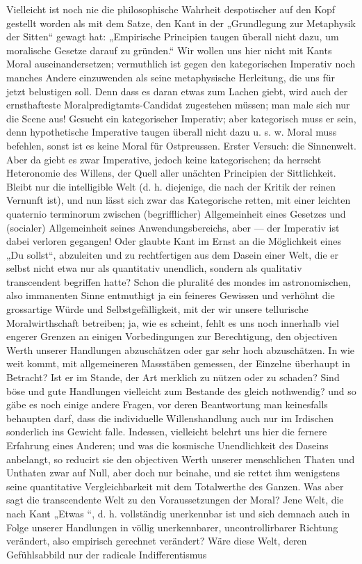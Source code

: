 Vielleicht ist noch nie die philosophische Wahrheit despotischer auf den Kopf gestellt worden als mit dem Satze, den Kant in der „Grundlegung zur Metaphysik der Sitten“ gewagt hat: „Empirische Principien taugen überall nicht dazu, um moralische Gesetze darauf zu gründen.“ Wir wollen uns hier nicht mit Kants Moral auseinandersetzen; vermuthlich ist gegen den kategorischen Imperativ noch manches Andere einzuwenden als seine metaphysische Herleitung, die uns für jetzt belustigen soll. Denn dass es daran etwas zum Lachen giebt, wird auch der ernsthafteste Moralpredigtamts-Candidat zugestehen müssen; man male sich nur die Scene aus! Gesucht ein kategorischer Imperativ; aber kategorisch muss er sein, denn hypothetische Imperative taugen überall nicht dazu u. s. w. Moral muss  befehlen, sonst ist es keine Moral für Ostpreussen. Erster Versuch: die Sinnenwelt. Aber da giebt es zwar Imperative, jedoch keine kategorischen; da herrscht Heteronomie des Willens, der Quell aller unächten Principien der Sittlichkeit. Bleibt nur die intelligible Welt (d. h. diejenige, die nach der Kritik der reinen Vernunft  ist), und nun lässt sich zwar das Kategorische retten, mit einer leichten quaternio terminorum zwischen (begrifflicher) Allgemeinheit eines Gesetzes und (socialer) Allgemeinheit seines Anwendungsbereichs, aber — der Imperativ ist dabei verloren gegangen! Oder glaubte Kant im Ernst an die Möglichkeit eines „Du sollst“, abzuleiten und zu rechtfertigen aus dem Dasein einer Welt, die er selbst nicht etwa nur als quantitativ unendlich, sondern als qualitativ transcendent begriffen hatte? Schon die pluralité des mondes im astronomischen, also immanenten Sinne entmuthigt ja ein feineres Gewissen und verhöhnt die grossartige Würde und Selbstgefälligkeit, mit der wir unsere tellurische Moralwirthschaft betreiben; ja, wie es scheint, fehlt es uns noch innerhalb viel engerer Grenzen an einigen Vorbedingungen zur Berechtigung, den objectiven Werth unserer Handlungen abzuschätzen oder gar sehr hoch abzuschätzen. In wie weit kommt, mit allgemeineren Massstäben gemessen, der Einzelne überhaupt in Betracht? Ist er im Stande, der Art merklich zu nützen oder zu schaden? Sind böse und gute Handlungen vielleicht zum Bestande des  gleich nothwendig? und so gäbe es noch einige andere Fragen, vor deren Beantwortung man keinesfalls behaupten darf, dass die individuelle Willenshandlung auch nur im Irdischen sonderlich ins Gewicht falle. Indessen, vielleicht belehrt uns hier die fernere Erfahrung eines Anderen; und was die kosmische Unendlichkeit des Daseins anbelangt, so reducirt sie den objectiven Werth unserer menschlichen Thaten und Unthaten zwar  auf Null, aber doch nur beinahe, und sie rettet ihm wenigstens seine quantitative Vergleichbarkeit mit dem Totalwerthe des Ganzen. Was aber sagt die transcendente Welt zu den Voraussetzungen der Moral? Jene Welt, die nach Kant „Etwas “, d. h. vollständig unerkennbar ist und sich demnach auch in Folge unserer Handlungen in völlig unerkennbarer, uncontrollirbarer Richtung verändert, also empirisch gerechnet  verändert? Wäre diese Welt, deren Gefühlsabbild nur der radicale Indifferentismus 